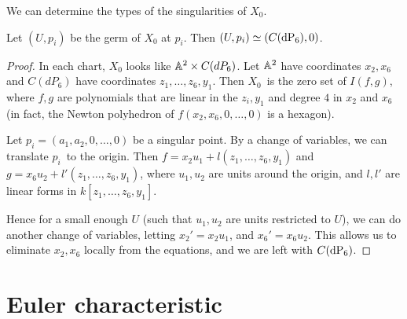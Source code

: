 We can determine the types of the singularities of $X_0$.

\begin{lemma}
Let $(U,p_i)$ be the germ of $X_0$ at $p_i$. Then $(U,p_i) \simeq (C(\dP6),0)$.
\end{lemma}
\begin{proof}
In each chart, $X_0$ looks like $\mathbb{A}^2 \times C(dP_6)$. Let $\mathbb{A}^2$ have coordinates $x_2,x_6$ and $C(dP_6)$ have coordinates $z_1,\ldots,z_6,y_1$. Then $X_0$ is the zero set of $I(f,g)$, where $f,g$ are polynomials that are linear in the $z_i,y_1$ and degree $4$ in $x_2$ and $x_6$ (in fact, the Newton polyhedron of $f(x_2,x_6,0,\ldots,0)$ is a hexagon).

Let $p_i=(a_1,a_2,0,\ldots,0)$ be a singular point. By a change of variables, we can translate $p_i$ to the origin. Then $f=x_2u_1+l(z_1,\ldots,z_6,y_1)$ and $g=x_6u_2 + l'(z_1,\ldots,z_6,y_1)$, where $u_1,u_2$ are units around the origin, and $l,l'$ are linear forms in $k[z_1,\ldots,z_6,y_1]$.

Hence for a small enough $U$ (such that $u_1,u_2$ are units restricted to $U$), we can do another change of variables, letting $x_2'=x_2u_1$, and $x_6'=x_6u_2$. This allows us to eliminate $x_2,x_6$ locally from the equations, and we are left with $C(\dP6)$.
\end{proof}



\section{Euler characteristic}